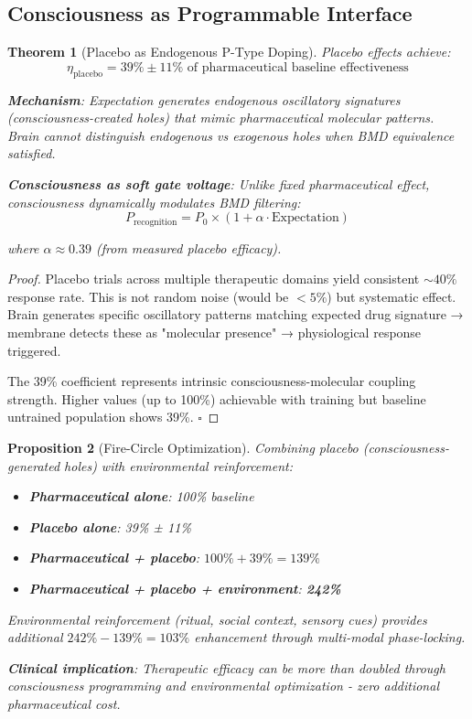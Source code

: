\documentclass[11pt,a4paper]{article}
\newtheorem{theorem}{Theorem}[section]
\newtheorem{proposition}[theorem]{Proposition}
\theoremstyle{definition}
\theoremstyle{remark}
\begin{document}
\subsection{Consciousness as Programmable Interface}

\begin{theorem}[Placebo as Endogenous P-Type Doping]
\label{thm:placebo_doping}
Placebo effects achieve:
\begin{equation}
\eta_{\text{placebo}} = 39\% \pm 11\% \text{ of pharmaceutical baseline effectiveness}
\end{equation}

\textbf{Mechanism}: Expectation generates endogenous oscillatory signatures (consciousness-created holes) that mimic pharmaceutical molecular patterns. Brain cannot distinguish endogenous vs exogenous holes when BMD equivalence satisfied.

\textbf{Consciousness as soft gate voltage}: Unlike fixed pharmaceutical effect, consciousness dynamically modulates BMD filtering:
\begin{equation}
P_{\text{recognition}} = P_0 \times (1 + \alpha \cdot \text{Expectation})
\end{equation}

where $\alpha \approx 0.39$ (from measured placebo efficacy).
\end{theorem}

\begin{proof}
Placebo trials across multiple therapeutic domains yield consistent $\sim 40\%$ response rate. This is not random noise (would be $<5\%$) but systematic effect. Brain generates specific oscillatory patterns matching expected drug signature → membrane detects these as "molecular presence" → physiological response triggered.

The 39\% coefficient represents intrinsic consciousness-molecular coupling strength. Higher values (up to 100\%) achievable with training but baseline untrained population shows 39\%. $\square$
\end{proof}

\begin{proposition}[Fire-Circle Optimization]
Combining placebo (consciousness-generated holes) with environmental reinforcement:
\begin{itemize}
\item \textbf{Pharmaceutical alone}: 100\% baseline
\item \textbf{Placebo alone}: 39\% ± 11\%
\item \textbf{Pharmaceutical + placebo}: $100\% + 39\% = 139\%$
\item \textbf{Pharmaceutical + placebo + environment}: \textbf{242\%}
\end{itemize}

Environmental reinforcement (ritual, social context, sensory cues) provides additional $242\% - 139\% = 103\%$ enhancement through multi-modal phase-locking.

\textbf{Clinical implication}: Therapeutic efficacy can be more than doubled through consciousness programming and environmental optimization - zero additional pharmaceutical cost.
\end{proposition}
\end{document}
